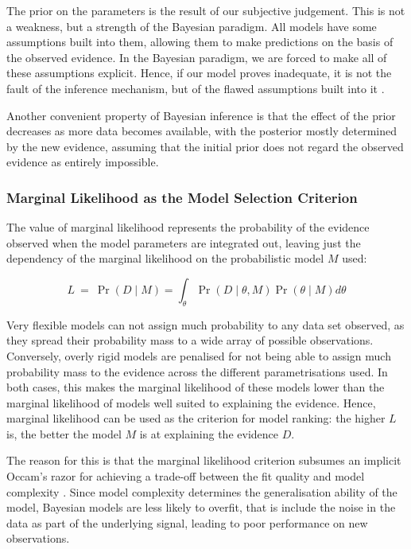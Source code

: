The prior on the parameters is the result of our subjective judgement. This is not a weakness, but a strength of the Bayesian paradigm. All models have some assumptions built into them, allowing them to make predictions on the basis of the observed evidence. In the Bayesian paradigm, we are forced to make all of these assumptions explicit. Hence, if our model proves inadequate, it is not the fault of the inference mechanism, but of the flawed assumptions built into it \cite{gha12}. 

Another convenient property of Bayesian inference is that the effect of the prior decreases as more data becomes available, with the posterior mostly determined by the new evidence, assuming that the initial prior does not regard the observed evidence as entirely impossible. 


\subsubsection*{Marginal Likelihood as the Model Selection Criterion}

The value of marginal likelihood represents the probability of the evidence observed when the model parameters are integrated out, leaving just the dependency of the marginal likelihood on the probabilistic model $M$ used:

\begin{equation*} L ~=~ \Pr (D \mid M) = \int_{\theta}{\Pr(D \mid \theta, M) \Pr (\theta \mid M)} d\theta \end{equation*}

Very flexible models can not assign much probability to any data set observed, as they spread their probability mass to a wide array of possible observations. Conversely, overly rigid models are penalised for not being able to assign much probability mass to the evidence across the different parametrisations used. In both cases, this makes the marginal likelihood of these models lower than the marginal likelihood of models well suited to explaining the evidence. Hence, marginal likelihood can be used as the criterion for model ranking: the higher $L$ is, the better the model $M$ is at explaining the evidence $D$. 

The reason for this is that the marginal likelihood criterion subsumes an implicit Occam's razor for achieving a trade-off between the fit quality and model complexity \citep{zoubinoccam, rasmussen06}. Since model complexity determines the generalisation ability of the model, Bayesian models are less likely to overfit, that is include the noise in the data as part of the underlying signal, leading to poor performance on new observations. 

